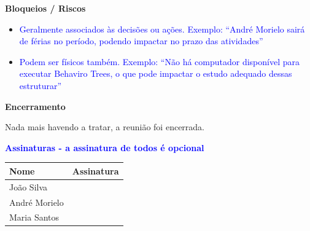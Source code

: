 \documentclass[12pt,a4paper]{article}
\begin{document}
\vspace{1em}

\textbf{Bloqueios / Riscos}

\begin{itemize}
\item \textcolor{blue}{Geralmente associados às decisões ou ações. Exemplo: ``André Morielo sairá de férias no período, podendo impactar no prazo das atividades''}
\item \textcolor{blue}{Podem ser físicos também. Exemplo: ``Não há computador disponível para executar Behaviro Trees, o que pode impactar o estudo adequado dessas estruturar''}
\end{itemize}

\vspace{2em}

\textbf{Encerramento}

Nada mais havendo a tratar, a reunião foi encerrada.

\vspace{3em}

\textbf{\textcolor{blue}{Assinaturas - a assinatura de todos é opcional}}

\vspace{1em}

\begin{longtable}{|p{6cm}|p{9cm}|}
\hline
\textbf{Nome} & \textbf{Assinatura} \\
\hline
João Silva & \\[2.5cm]
\hline
André Morielo & \\[2.5cm]
\hline
Maria Santos & \\[2.5cm]
\hline
\end{longtable}
\end{document}
